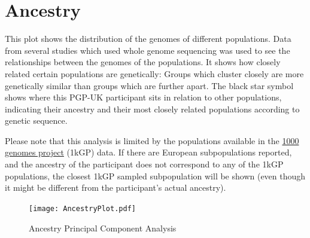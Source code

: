 \documentclass{article}
\begin{document}
\vspace{15 mm}


\begin{multicols}{2}


{}

\end{multicols}

\par
{}



\pagebreak

\section{Ancestry}

This plot shows the distribution of the genomes of different populations. Data from several studies which used whole genome sequencing was used to see the relationships between the genomes of the populations. It shows how closely related certain populations are genetically: Groups which cluster closely are more genetically similar than groups which are further apart. The black star symbol shows where this PGP-UK participant sits in relation to other populations, indicating their ancestry and their most closely related populations according to genetic sequence.
\par
Please note that this analysis is limited by the populations available in the  \href{http://www.internationalgenome.org/category/population/}{1000 genomes project} (1kGP) data. If there are European subpopulations reported, and the ancestry of the participant does not correspond to any of the 1kGP populations, the closest 1kGP sampled subpopulation will be shown (even though it might be different from the participant's actual ancestry).


\vspace{15 mm}


\begin{figure}[H]
\begin{centering}
\texttt{[image: AncestryPlot.pdf]}
\par\end{centering}

\caption{Ancestry Principal Component Analysis}
\end{figure}
\end{document}
